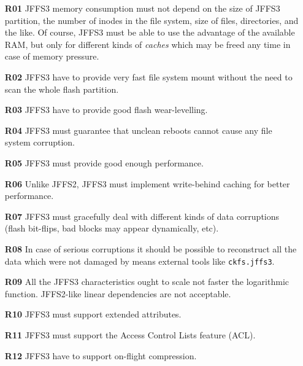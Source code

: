 \documentclass[12pt,a4paper,oneside,titlepage]{article}
\begin{document}
\begin{enumerate}

\item[\textbf{R01}]
JFFS3 memory consumption must not depend on the size of JFFS3
partition, the number of inodes in the file system, size of files,
directories, and the like. Of course, JFFS3 must be able to use the advantage
of the available RAM, but only for different kinds of \emph{caches}
which may be freed any time in case of memory pressure.

\item[\textbf{R02}] 
JFFS3 have to provide very fast file system mount without the need to scan the
whole flash partition.

\item[\textbf{R03}]
JFFS3 have to provide good flash \mbox{wear-levelling}.

\item[\textbf{R04}]
JFFS3 must guarantee that unclean reboots cannot cause any file system
corruption.

\item[\textbf{R05}]
JFFS3 must provide good enough performance.

\item[\textbf{R06}]
Unlike JFFS2, JFFS3 must implement \mbox{write-behind} caching for better
performance.

\item[\textbf{R07}]
JFFS3 must gracefully deal with different kinds of data corruptions (flash
\mbox{bit-flips}, bad blocks may appear dynamically, etc).

\item[\textbf{R08}]
In case of serious corruptions it should be possible to reconstruct all the
data which were not damaged by means external tools like \texttt{ckfs.jffs3}.

\item[\textbf{R09}] All the JFFS3 characteristics ought to scale not faster the
logarithmic function. \mbox{JFFS2-like} linear dependencies are not
acceptable. 

\item[\textbf{R10}]
JFFS3 must support extended attributes.

\item[\textbf{R11}]
JFFS3 must support the Access Control Lists feature (ACL).

\item[\textbf{R12}]
JFFS3 have to support \mbox{on-flight} compression.

\end{enumerate}
\end{document}
